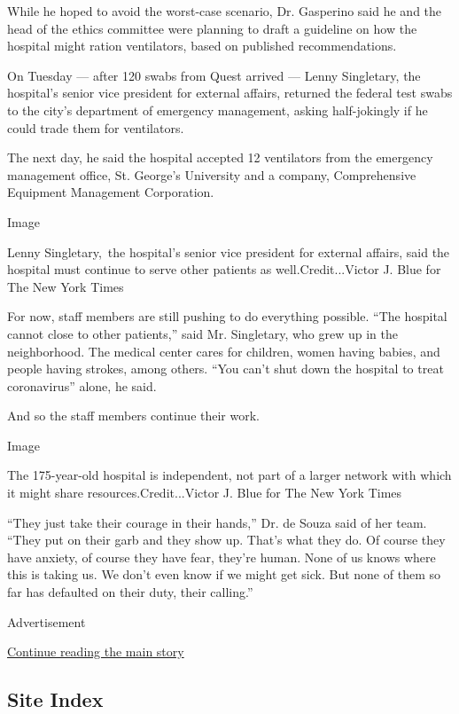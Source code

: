 While he hoped to avoid the worst-case scenario, Dr. Gasperino said he
and the head of the ethics committee were planning to draft a guideline
on how the hospital might ration ventilators, based on published
recommendations.

On Tuesday --- after 120 swabs from Quest arrived --- Lenny Singletary,
the hospital's senior vice president for external affairs, returned the
federal test swabs to the city's department of emergency management,
asking half-jokingly if he could trade them for ventilators.

The next day, he said the hospital accepted 12 ventilators from the
emergency management office, St. George's University and a company,
Comprehensive Equipment Management Corporation.

Image

Lenny Singletary,~the hospital's senior vice president for external
affairs, said the hospital must continue to serve other patients as
well.Credit...Victor J. Blue for The New York Times

For now, staff members are still pushing to do everything possible.
``The hospital cannot close to other patients,'' said Mr. Singletary,
who grew up in the neighborhood. The medical center cares for children,
women having babies, and people having strokes, among others. ``You
can't shut down the hospital to treat coronavirus'' alone, he said.

And so the staff members continue their work.

Image

The 175-year-old hospital is independent, not part of a larger network
with which it might share resources.Credit...Victor J. Blue for The New
York Times

``They just take their courage in their hands,'' Dr. de Souza said of
her team. ``They put on their garb and they show up. That's what they
do. Of course they have anxiety, of course they have fear, they're
human. None of us knows where this is taking us. We don't even know if
we might get sick. But none of them so far has defaulted on their duty,
their calling.''

Advertisement

\protect\hyperlink{after-bottom}{Continue reading the main story}

\hypertarget{site-index}{%
\subsection{Site Index}\label{site-index}}

